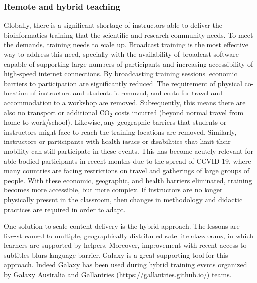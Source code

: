 \documentclass[10pt,letterpaper]{article}
\begin{document}
\subsubsection*{Remote and hybrid teaching}

Globally, there is a significant shortage of instructors able to deliver the bioinformatics training that the scientific and research community needs. To meet the demands, training needs to scale up. Broadcast training is the most effective way to address this need, specially with the availability of broadcast software capable of supporting large numbers of participants and increasing accessibility of high-speed internet connections. By broadcasting training sessions, economic barriers to participation are significantly reduced. The requirement of physical co-location of instructors and students is removed, and costs for travel and accommodation to a workshop are removed. Subsequently, this means there are also no transport or additional CO$_2$ costs incurred (beyond normal travel from home to work/school). Likewise, any geographic barriers that students or instructors might face to reach the training locations are removed. Similarly, instructors or participants with health issues or disabilities that limit their mobility can still participate in these events. This has become acutely relevant for able-bodied participants in recent months due to the spread of COVID-19, where many countries are facing restrictions on travel and gatherings of large groups of people. With these economic, geographic, and health barriers eliminated, training becomes more accessible, but more complex. If instructors are no longer physically present in the classroom, then changes in methodology and didactic practices are required in order to adapt.

One solution to scale content delivery is the hybrid approach. The lessons are live-streamed to multiple, geographically distributed satellite classrooms, in which learners are supported by helpers. Moreover, improvement with recent access to subtitles blurs language barrier. Galaxy is a great supporting tool for this approach. Indeed Galaxy has been used during hybrid training events organized by Galaxy Australia \cite{Hall2021} and Gallantries (\url{https://gallantries.github.io/}) teams.
\end{document}
